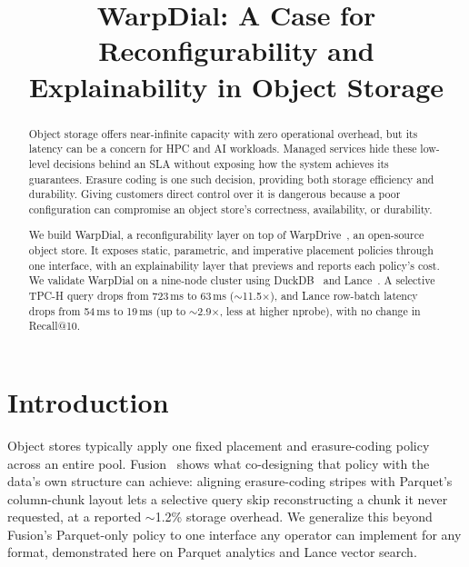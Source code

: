 \documentclass[10pt,conference]{IEEEtran}
\begin{document}

\title{WarpDial: A Case for Reconfigurability and Explainability in Object Storage}

\author{
}

\maketitle

\begin{abstract} Object storage offers near-infinite capacity with zero
operational overhead, but its latency can be a concern for HPC and AI
workloads. Managed services hide these low-level
decisions behind an SLA without exposing how the system achieves its
guarantees. Erasure coding is one such decision, providing both storage
efficiency and durability. Giving customers direct control over it is
dangerous because a poor configuration can compromise an object store's
correctness, availability, or durability.

We build WarpDial, a reconfigurability layer on top of
WarpDrive~\cite{warpdrive2026}, an open-source object store. It exposes
static, parametric, and imperative placement policies through one
interface, with an explainability layer that previews and reports each
policy's cost. We validate WarpDial on a nine-node cluster using
DuckDB~\cite{duckdb2019,tpch} and
Lance~\cite{lance2025}. A selective TPC-H query
drops from 723\,ms to 63\,ms ($\sim$11.5$\times$), and Lance row-batch
latency drops from 54\,ms to 19\,ms (up to $\sim$2.9$\times$, less at
higher nprobe), with no change in Recall@10.
\end{abstract}
\FloatBarrier

\section{Introduction}

Object stores typically apply one fixed placement and erasure-coding
policy across an entire pool. Fusion~\cite{fusion2025} shows what
co-designing that policy with the data's own structure can achieve:
aligning erasure-coding stripes with Parquet's column-chunk layout lets
a selective query skip reconstructing a chunk it never requested, at a
reported $\sim$1.2\% storage overhead. We generalize this beyond
Fusion's Parquet-only policy to one interface any operator can
implement for any format, demonstrated here on Parquet analytics and
Lance vector search.
\end{document}
